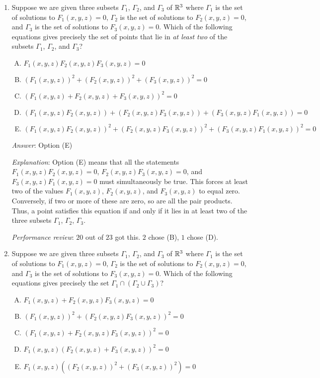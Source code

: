 \documentclass[10pt]{amsart}
\begin{document}
\begin{enumerate}

\item Suppose we are given three subsets $\Gamma_1$, $\Gamma_2$, and
  $\Gamma_3$ of $\mathbb{R}^3$ where $\Gamma_1$ is the set of solutions to
  $F_1(x,y,z) = 0$, $\Gamma_2$ is the set of solutions to $F_2(x,y,z)
  = 0$, and $\Gamma_3$ is the set of solutions to $F_3(x,y,z) =
  0$. Which of the following equations gives precisely the set of
  points that lie in {\em at least two} of the subsets $\Gamma_1$,
  $\Gamma_2$, and $\Gamma_3$?

  \begin{enumerate}[(A)]
  \item $F_1(x,y,z)F_2(x,y,z)F_3(x,y,z) = 0$
  \item $(F_1(x,y,z))^2 + (F_2(x,y,z))^2 + (F_3(x,y,z))^2 = 0$
  \item $(F_1(x,y,z) + F_2(x,y,z) + F_3(x,y,z))^2 = 0$
  \item $(F_1(x,y,z)F_2(x,y,z)) + (F_2(x,y,z)F_3(x,y,z)) +
    (F_3(x,y,z)F_1(x,y,z)) = 0$
  \item $(F_1(x,y,z)F_2(x,y,z))^2 + (F_2(x,y,z)F_3(x,y,z))^2 +
    (F_3(x,y,z)F_1(x,y,z))^2 = 0$
  \end{enumerate}

  {\em Answer}: Option (E)

  {\em Explanation}: Option (E) means that all the statements
  $F_1(x,y,z)F_2(x,y,z) = 0$, $F_2(x,y,z)F_3(x,y,z) = 0$, and
  $F_3(x,y,z)F_1(x,y,z) = 0$ must simultaneously be true. This forces
  at least two of the values $F_1(x,y,z)$, $F_2(x,y,z)$, and
  $F_3(x,y,z)$ to equal zero. Conversely, if two or more of these are
  zero, so are all the pair products. Thus, a point satisfies this
  equation if and only if it lies in at least two of the three subsets
  $\Gamma_1$, $\Gamma_2$, $\Gamma_3$.

  {\em Performance review}: $20$ out of $23$ got this. $2$ chose (B),
  $1$ chose (D).

\item Suppose we are given three subsets $\Gamma_1$, $\Gamma_2$, and
  $\Gamma_3$ of $\mathbb{R}^3$ where $\Gamma_1$ is the set of solutions to
  $F_1(x,y,z) = 0$, $\Gamma_2$ is the set of solutions to $F_2(x,y,z)
  = 0$, and $\Gamma_3$ is the set of solutions to $F_3(x,y,z) =
  0$. Which of the following equations gives precisely the set
  $\Gamma_1 \cap (\Gamma_2 \cup \Gamma_3)$?

  \begin{enumerate}[(A)]
  \item $F_1(x,y,z) + F_2(x,y,z)F_3(x,y,z) = 0$
  \item $(F_1(x,y,z))^2 + (F_2(x,y,z)F_3(x,y,z))^2 = 0$
  \item $(F_1(x,y,z) + F_2(x,y,z)F_3(x,y,z))^2 = 0$
  \item $F_1(x,y,z)(F_2(x,y,z) + F_3(x,y,z))^2 = 0$
  \item $F_1(x,y,z)((F_2(x,y,z))^2 + (F_3(x,y,z))^2) = 0$
  \end{enumerate}


\end{enumerate}
\end{document}
